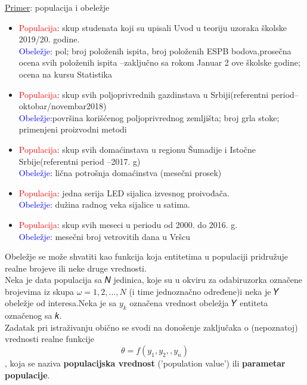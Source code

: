 \documentclass[10pt,a4paper,]{article}
\begin{document}
\underline{Primer}: populacija i obeležje
\begin{itemize}
\item 
\textcolor{red}{Populacija}: skup studenata koji su upisali Uvod u teoriju uzoraka školske 2019/20. godine.
\\
\textcolor{blue}{Obeležje}: pol; broj položenih ispita, broj položenih ESPB bodova,prosečna ocena svih položenih ispita –zaključno sa rokom Januar 2 ove školske godine; ocena na kursu Statistika
\item
\textcolor{red}{Populacija}: skup svih poljoprivrednih gazdinstava u Srbiji(referentni period–oktobar/novembar2018)
\\
\textcolor{blue}{Obeležje}:površina korišćenog poljoprivrednog zemljišta;
broj grla stoke; primenjeni proizvodni metodi

\item
\textcolor{red}{Populacija}: skup svih domaćinstava u regionu Šumadije i Istočne Srbije(referentni period –2017. g)
\\
\textcolor{blue}{Obeležje}: lična potrošnja domaćinstva (mesečni prosek)

\item
\textcolor{red}{Populacija}: jedna serija LED sijalica izvesnog proivođača.
\\
\textcolor{blue}{Obeležje}: dužina radnog veka sijalice u satima.


\item
\textcolor{red}{Populacija}: skup svih meseci u periodu od 2000. do 2016. g.
\\
\textcolor{blue}{Obeležje}: mesečni broj vetrovitih dana u Vršcu	
\end{itemize}


Obeležje se može shvatiti kao funkcija koja entitetima u populaciji 
pridružuje realne brojeve ili neke druge vrednosti.
\\
Neka je data 
populacija sa 𝑁 jedinica, koje su u okviru za odabiruzorka označene 
brojevima iz skupa $\omega={1,2,...,𝑁}$ (i time jednoznačno određene)i neka 
je 𝑌 obeležje od interesa.Neka je sa $y_k$ označena vrednost obeležja 
𝑌 entiteta označenog sa 𝑘. \\

Zadatak pri istraživanju obično se svodi na donošenje zaključaka o 
(nepoznatoj) vrednosti realne funkcije 
$$\theta=f(y_{1},y_{2},,y_{n})$$, koja se naziva 
\textbf{populacijska vrednost} ('population value') ili 
\textbf{parametar populacije}.
\\
\end{document}

